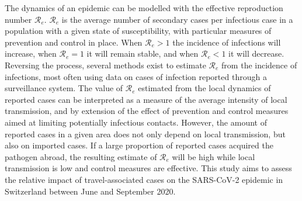 \documentclass[10pt, a4paper, twoside]{article}
\begin{document}
\begin{multicols}{2}
The dynamics of an epidemic can be modelled with the effective reproduction number $\mathcal{R}_e$. 
$\mathcal{R}_e$ is the average number of secondary cases per infectious case in a population with a given state of susceptibility, with particular measures of prevention and control in place.
When $\mathcal{R}_e > 1$ the incidence of infections will increase, when $\mathcal{R}_e = 1$ it will remain stable, and when $\mathcal{R}_e < 1$ it will decrease. 
Reversing the process, several methods exist to estimate $\mathcal{R}_e$ from the incidence of infections, most often using data on cases of infection reported through a surveillance system.
The value of $\mathcal{R}_e$ estimated from the local dynamics of reported cases can be interpreted as a measure of the average intensity of local transmission, and by extension of the effect of prevention and control measures aimed at limiting potentially infectious contacts.
However, the amount of reported cases in a given area does not only depend on local transmission, but also on imported cases.
If a large proportion of reported cases acquired the pathogen abroad, the resulting estimate of $\mathcal{R}_e$ will be high while local transmission is low and control measures are effective.
This study aims to assess the relative impact of travel-associated cases on the SARS-CoV-2 epidemic in Switzerland between June and September 2020.




\end{multicols}
\end{document}
